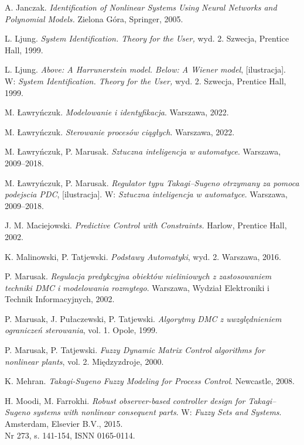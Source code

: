 \begin{thebibliography}{99}

 A. Janczak. \textit{Identification of Nonlinear Systems Using Neural Networks and Polynomial Models.} Zielona Góra, Springer, 2005.

 L. Ljung. \textit{System Identification. Theory for the User,} wyd. 2. Szwecja, Prentice Hall, 1999.

 L. Ljung. \textit{Above: A Harrunerstein model. Below: A Wiener model}, [ilustracja]. \\ W: \textit{System Identification. Theory for the User,} wyd. 2. Szwecja, Prentice Hall, 1999. 

 M. Ławryńczuk. \textit{Modelowanie i identyfikacja}. Warszawa, 2022.

 M. Ławryńczuk. \textit{Sterowanie procesów ciągłych}. Warszawa, 2022.

 M. Ławryńczuk, P. Marusak. \textit{Sztuczna inteligencja w automatyce}. Warszawa, 2009–2018.

 M. Ławryńczuk, P. Marusak. \textit{Regulator typu Takagi–Sugeno otrzymany za pomoca podejscia PDC}, [ilustracja]. W: \textit{Sztuczna inteligencja w automatyce}. Warszawa, 2009–2018.

 J. M. Maciejowski. \textit{Predictive Control with Constraints.} Harlow, Prentice Hall, 2002.

 K. Malinowski, P. Tatjewski. \textit{Podstawy Automatyki}, wyd. 2. Warszawa, 2016.

 P. Marusak. \textit{Regulacja predykcyjna obiektów nieliniowych z zastosowaniem techniki DMC i modelowania rozmytego}. Warszawa, Wydział Elektroniki i Technik Informacyjnych, 2002.

 P. Marusak, J. Pułaczewski, P. Tatjewski. \textit{Algorytmy DMC z uwzględnieniem ograniczeń sterowania}, vol. 1.  Opole, 1999.

 P. Marusak, P. Tatjewski. \textit{Fuzzy Dynamic Matrix Control algorithms for nonlinear plants}, vol. 2. Międzyzdroje, 2000.

 K. Mehran. \textit{Takagi-Sugeno Fuzzy Modeling for Process Control}. Newcastle, 2008.

 H. Moodi, M. Farrokhi. \textit{Robust observer-based controller design for Takagi–Sugeno systems with nonlinear consequent parts}. W: \textit{Fuzzy Sets and Systems}. Amsterdam, Elsevier B.V., 2015.\\ Nr 273, s. 141-154, ISNN 0165-0114.


\end{thebibliography}
